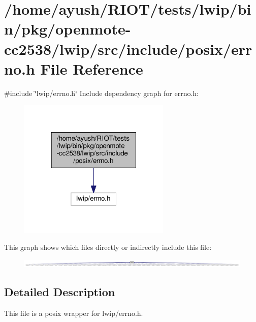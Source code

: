 \hypertarget{openmote-cc2538_2lwip_2src_2include_2posix_2errno_8h}{}\section{/home/ayush/\+R\+I\+O\+T/tests/lwip/bin/pkg/openmote-\/cc2538/lwip/src/include/posix/errno.h File Reference}
\label{openmote-cc2538_2lwip_2src_2include_2posix_2errno_8h}
{\ttfamily \#include \char`\"{}lwip/errno.\+h\char`\"{}}\newline
Include dependency graph for errno.\+h\+:
\nopagebreak
\begin{figure}[H]
\begin{center}
\leavevmode
\includegraphics[width=205pt]{openmote-cc2538_2lwip_2src_2include_2posix_2errno_8h__incl}
\end{center}
\end{figure}
This graph shows which files directly or indirectly include this file\+:
\nopagebreak
\begin{figure}[H]
\begin{center}
\leavevmode
\includegraphics[width=350pt]{openmote-cc2538_2lwip_2src_2include_2posix_2errno_8h__dep__incl}
\end{center}
\end{figure}


\subsection{Detailed Description}
This file is a posix wrapper for lwip/errno.\+h. 